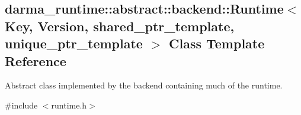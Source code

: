 \hypertarget{classdarma__runtime_1_1abstract_1_1backend_1_1_runtime}{}\subsection{darma\+\_\+runtime\+:\+:abstract\+:\+:backend\+:\+:Runtime$<$ Key, Version, shared\+\_\+ptr\+\_\+template, unique\+\_\+ptr\+\_\+template $>$ Class Template Reference}
\label{classdarma__runtime_1_1abstract_1_1backend_1_1_runtime}


Abstract class implemented by the backend containing much of the runtime.  




{\ttfamily \#include $<$runtime.\+h$>$}

